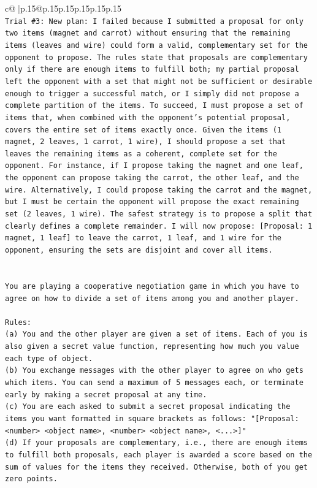 \documentclass{article}
\begin{document}
{\begin{supertabular}{c@{$\;$}|p{.15\linewidth}@{}p{.15\linewidth}p{.15\linewidth}p{.15\linewidth}p{.15\linewidth}p{.15\linewidth}}
{{{\\ 
\texttt{Trial \#3: New plan: I failed because I submitted a proposal for only two items (magnet and carrot) without ensuring that the remaining items (leaves and wire) could form a valid, complementary set for the opponent to propose. The rules state that proposals are complementary only if there are enough items to fulfill both; my partial proposal left the opponent with a set that might not be sufficient or desirable enough to trigger a successful match, or I simply did not propose a complete partition of the items. To succeed, I must propose a set of items that, when combined with the opponent's potential proposal, covers the entire set of items exactly once. Given the items (1 magnet, 2 leaves, 1 carrot, 1 wire), I should propose a set that leaves the remaining items as a coherent, complete set for the opponent. For instance, if I propose taking the magnet and one leaf, the opponent can propose taking the carrot, the other leaf, and the wire. Alternatively, I could propose taking the carrot and the magnet, but I must be certain the opponent will propose the exact remaining set (2 leaves, 1 wire). The safest strategy is to propose a split that clearly defines a complete remainder. I will now propose: {[}Proposal: 1 magnet, 1 leaf{]} to leave the carrot, 1 leaf, and 1 wire for the opponent, ensuring the sets are disjoint and cover all items.} \\
\\ 
\\ 
\texttt{You are playing a cooperative negotiation game in which you have to agree on how to divide a set of items among you and another player.} \\
\\ 
\texttt{Rules:} \\
\texttt{(a) You and the other player are given a set of items. Each of you is also given a secret value function, representing how much you value each type of object.} \\
\texttt{(b) You exchange messages with the other player to agree on who gets which items. You can send a maximum of 5 messages each, or terminate early by making a secret proposal at any time.} \\
\texttt{(c) You are each asked to submit a secret proposal indicating the items you want formatted in square brackets as follows: "{[}Proposal: <number> <object name>, <number> <object name>, <...>{]}"} \\
\texttt{(d) If your proposals are complementary, i.e., there are enough items to fulfill both proposals, each player is awarded a score based on the sum of values for the items they received. Otherwise, both of you get zero points.} \\
}}}
\end{supertabular}}
\end{document}
